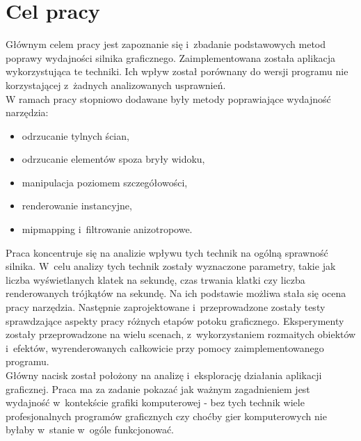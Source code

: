 \documentclass[a4paper,twoside,12pt]{book}
\begin{document}
\section{Cel pracy}
Głównym celem pracy jest zapoznanie się i~zbadanie podstawowych metod poprawy wydajności silnika graficznego. Zaimplementowana została aplikacja wykorzystująca te techniki. Ich wpływ został porównany do wersji programu nie korzystającej z~żadnych analizowanych usprawnień. \\

W ramach pracy stopniowo dodawane były metody poprawiające wydajność narzędzia:
\begin{itemize}
    \item odrzucanie tylnych ścian,
    \item odrzucanie elementów spoza bryły widoku,
    \item manipulacja poziomem szczegółowości,
    \item renderowanie instancyjne,
    \item mipmapping i~filtrowanie anizotropowe.
\end{itemize}

Praca koncentruje się na analizie wpływu tych technik na ogólną sprawność silnika. W~celu analizy tych technik zostały wyznaczone parametry, takie jak liczba wyświetlanych klatek na sekundę, czas trwania klatki czy liczba renderowanych trójkątów na sekundę. Na ich podstawie możliwa stała się ocena pracy narzędzia. Następnie zaprojektowane i~przeprowadzone zostały testy sprawdzające aspekty pracy różnych etapów potoku graficznego. Eksperymenty zostały przeprowadzone na wielu scenach, z~wykorzystaniem rozmaitych obiektów i~efektów, wyrenderowanych całkowicie przy pomocy zaimplementowanego programu. \\

Główny nacisk został położony na analizę i~eksplorację działania aplikacji graficznej. Praca ma za zadanie pokazać jak ważnym zagadnieniem jest wydajność w~kontekście grafiki komputerowej - bez tych technik wiele profesjonalnych programów graficznych czy choćby gier komputerowych nie byłaby w~stanie w~ogóle funkcjonować.
\end{document}
